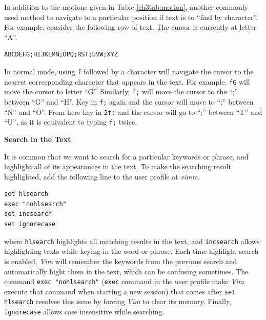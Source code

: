 In addition to the motions given in Table \ref{ch3tab:motion}, another commonly used method to navigate to a particular position if text is to ``find by character''. For example, consider the following row of text. The cursor is currently at letter ``A''.
\begin{verbatim}
ABCDEFG;HIJKLMN;OPQ;RST;UVW;XYZ
\end{verbatim}
In normal mode, using \verb|f| followed by a character will navigate the cursor to the nearest corresponding character that appears in the text. For example, \verb|fG| will move the cursor to letter ``G''. Similarly, \verb|f;| will move the cursor to the ``;'' between ``G'' and ``H''. Key in \verb|f;| again and the cursor will move to ``;'' between ``N'' and ``O''. From here key in \verb|2f:| and the cursor will go to ``;'' between ``T'' and ``U'', as it is equivalent to typing \verb|f;| twice.

\vspace{0.1in}
\noindent \textbf{Search in the Text}
\vspace{0.1in}

It is common that we want to search for a particular keywords or phrase, and highlight all of its appearances in the text. To make the searching result highlighted, add the following line to the user profile at \textit{vimrc}.
\begin{verbatim}
set hlsearch
exec "nohlsearch"
set incsearch
set ignorecase
\end{verbatim}
where \verb|hlsearch| highlights all matching results in the text, and \verb|incsearch| allows highlighting texts while keying in the word or phrase. Each time highlight search is enabled, \textit{Vim} will remember the keywords from the previous search and automatically hight them in the text, which can be confusing sometimes. The command \verb|exec "nohlsearch"| (\verb|exec| command in the user profile make \textit{Vim} execute that command when starting a new session) that comes after \verb|set hlsearch| resolves this issue by forcing \textit{Vim} to clear its memory. Finally, \verb|ignorecase| allows case insensitive while searching.

